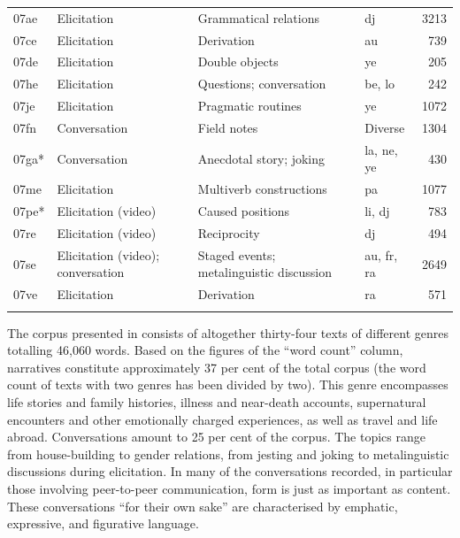 \begin{longtable}{l >{\raggedright}p{2.1cm} >{\raggedright}p{4.5cm} lr}
07ae & Elicitation & Grammatical relations & dj & 3213\\
07ce & Elicitation & Derivation & au & 739\\
07de & Elicitation & Double objects & ye & 205\\
07he & Elicitation & Questions; conversation & be, lo & 242\\
07je & Elicitation & Pragmatic routines & ye & 1072\\
07fn & Conversation & Field notes & Diverse & 1304\\
07ga* & Conversation & Anecdotal story; joking & la, ne, ye & 430\\
07me & Elicitation & Multiverb constructions & pa & 1077\\
07pe* & Elicitation (video) & Caused positions & li, dj & 783\\
07re & Elicitation (video) & Reciprocity & dj & 494\\
07se & Elicitation (video); conversation & Staged events; metalinguistic discussion & au, fr, ra & 2649\\
07ve & Elicitation & Derivation & ra & 571\\
\lspbottomrule
\end{longtable}
The corpus presented in  consists of altogether thirty-four texts of different genres totalling 46,060 words. Based on the figures of the “word count” column, narratives constitute approximately 37 per cent of the total corpus (the word count of texts with two genres has been divided by two). This genre encompasses life stories and family histories, illness and near-death accounts, supernatural encounters and other emotionally charged experiences, as well as travel and life abroad. Conversations amount to 25 per cent of the corpus. The topics range from house-building to gender relations, from jesting and joking to metalinguistic discussions during elicitation. In many of the conversations recorded, in particular those involving peer-to-peer communication, form is just as important as content. These conversations “for their own sake” are characterised by emphatic, expressive, and figurative language. 

